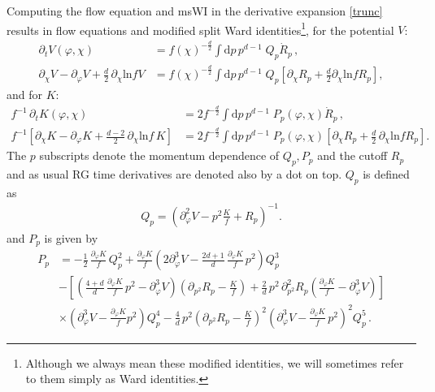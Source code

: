 \documentclass[11pt,draft]{book} %
\begin{document}
Computing the flow equation and msWI in the derivative expansion \eqref{trunc} results in flow equations
and modified split Ward identities\footnote{Although we always mean these modified identities,
we will sometimes refer to them  simply as Ward identities.}, for the potential $V$:
\begin{align}
  \label{flowV}
  \partial_t V(\varphi,\chi)
  &= f(\chi)^{-\frac{d}{2}} \int \mathrm dp\, p^{d-1} \; Q_p \dot R_p \,, \\
  \label{msWIV}
  \partial_\chi V - \partial_\varphi V + \frac{d}{2} \, \partial_\chi \text{ln} f V
  &= f(\chi)^{-\frac{d}{2}} \int \mathrm dp\, p^{d-1} \; Q_p
  \left[
    \partial_\chi R_p + \frac{d}{2}\partial_\chi \text{ln} f  R_p
  \right] ,
\end{align}
and for $K$:
\begin{align}
  \label{flowK}
  f^{-1} \, \partial_t K(\varphi,\chi)
  &= 2 f^{-\frac{d}{2}} \int \mathrm dp \, p^{d-1} \; P_p(\varphi,\chi)\dot R_p \,,\\
  \label{msWIK}
  f^{-1}
  \left[
    \partial_\chi K- \partial_\varphi K + \frac{d-2}{2} \, \partial_\chi \text{ln}f \, K
  \right]
  &= 2 f^{-\frac{d}{2}} \int \mathrm dp \, p^{d-1} \; P_p(\varphi,\chi)
  \left[
    \partial_{\chi} R_p + \frac{d}{2} \, \partial_\chi \mathrm{ln} f R_p
  \right].
\end{align}
The $p$ subscripts denote the momentum dependence of $Q_p, P_p$ and the cutoff $R_p$ and as
usual RG time derivatives are denoted also by a dot on top. $Q_p$ is defined as
\begin{align}
	Q_p = \left( \partial^2_\varphi V - p^2\frac{K}{f} + R_p \right)^{-1}.
	\label{Q}
\end{align}
and $P_p$ is given by
\begin{align}
	P_p &= - \frac{1}{2} \, \frac{\partial_\varphi K}{f} \, Q_p^2
	+ \frac{\partial_\varphi K}{f}
  \left(
    2 \partial_\varphi^3 V
    - \frac{2d+1}{d} \, \frac{\partial_{\varphi}K}{f} \, p^2
  \right) Q_p^3 \nonumber \\
  & -
  \left[
    \left(
      \frac{4+d}{d} \, \frac{\partial_\varphi K}{f} \, p^2
      - \partial^3_\varphi V
    \right)
    \left(
      \partial_{p^2} R_p - \frac{K}{f}
    \right)
    + \frac{2}{d} \, p^2 \, \partial^2_{p^2} R_p
    \left(
      \frac{\partial_\varphi K}{f} - \partial_\varphi^3 V
    \right)
  \right] \nonumber \\
  & \times \left(\partial_\varphi^3 V - \frac{\partial_\varphi K}{f}p^2\right)Q_p^4
  -\frac{4}{d} \, p^2
  \left(
    \partial_{p^2}R_p-\frac{K}{f}
  \right)^2
  \left(
    \partial_\varphi^3 V - \frac{\partial_\varphi K}{f} \, p^2
  \right)^2 Q_p^5 \,.
\end{align}
\end{document}

